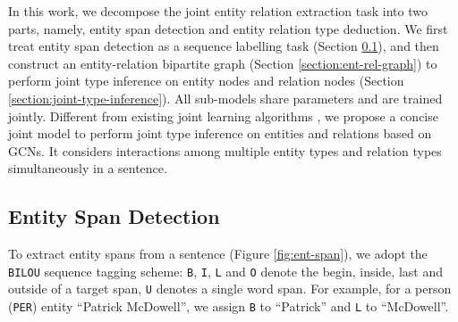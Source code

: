 In this work, we decompose the joint entity relation extraction task into two parts, namely,
entity span detection and entity relation type deduction.
We first treat entity span detection as a sequence labelling task (Section  \ref{section:ent_span}),
and then construct an entity-relation bipartite graph (Section \ref{section:ent-rel-graph}) to perform joint type inference on entity nodes and relation nodes (Section \ref{section:joint-type-inference}).
All sub-models  share parameters and are trained jointly.
Different from existing joint learning algorithms \cite{D18-1249,zhang-zhang-fu:2017:EMNLP2017,katiyar-cardie:2017:Long,miwa-bansal:2016:P16-1},
we propose a concise joint model to perform joint type inference
on entities and relations based on GCNs.
It considers interactions among multiple entity types and relation types
simultaneously in a sentence.
\subsection{Entity Span Detection} \label{section:ent_span}
To extract entity spans from a sentence (Figure \ref{fig:ent-span}),
we adopt the \texttt{BILOU} sequence tagging scheme: 
\texttt{B}, \texttt{I}, \texttt{L} and \texttt{O} denote the begin,
inside, last and outside of a target span,
\texttt{U} denotes a single word span.
For example, for a person (\texttt{PER}) entity ``Patrick McDowell'', 
we assign \texttt{B} to ``Patrick'' and \texttt{L} to ``McDowell''.


